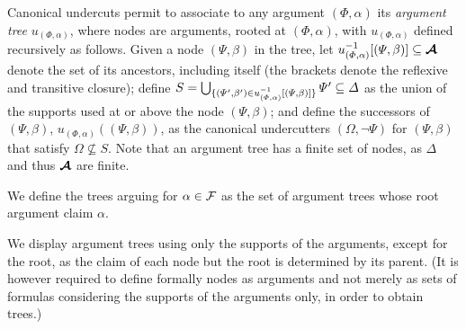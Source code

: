 \documentclass[version=3.21, pagesize, twoside=off, bibliography=totoc, DIV=calc, fontsize=12pt, a4paper, french, english]{scrartcl}
\begin{document}
Canonical undercuts permit to associate to any argument $(\Phi, \alpha)$ its \emph{argument tree} $u_{(\Phi, \alpha)}$, where nodes are arguments, rooted at $(\Phi, \alpha)$, with $u_{(\Phi, \alpha)}$ defined recursively as follows. 
Given a node $(\Psi, \beta)$ in the tree, let $u_{(\Phi, \alpha)}^{-1}[(\Psi, \beta)] \subseteq \bm{\mathcal{A}}$ denote the set of its ancestors, including itself (the brackets denote the reflexive and transitive closure); define $S = \bigcup_{\{(\Psi', \beta') \in u_{(\Phi, \alpha)}^{-1}[(\Psi, \beta)]\}} \Psi' \subseteq \Delta$ as the union of the supports used at or above the node $(\Psi, \beta)$; and define the successors of $(\Psi, \beta)$, $u_{(\Phi, \alpha)}((\Psi, \beta))$, as the canonical undercutters $(\Omega, ¬\Psi)$ for $(\Psi, \beta)$ that satisfy $\Omega \nsubseteq S$.
Note that an argument tree has a finite set of nodes, as $\Delta$ and thus $\bm{\mathcal{A}}$ are finite.

We define the trees arguing for $\alpha \in \mathcal{F}$ as the set of argument trees whose root argument claim $\alpha$.

We display argument trees using only the supports of the arguments, except for the root, as the claim of each node but the root is determined by its parent. (It is however required to define formally nodes as arguments and not merely as sets of formulas considering the supports of the arguments only, in order to obtain trees.)
\end{document}

